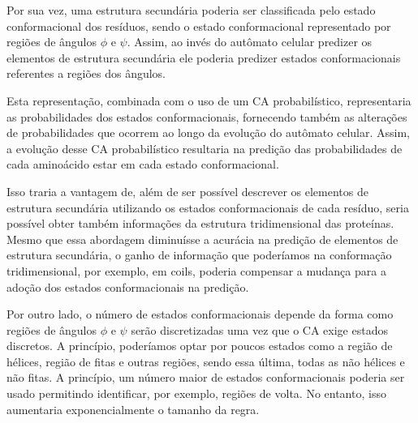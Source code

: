 Por sua vez, uma estrutura secundária poderia ser classificada pelo estado conformacional dos resíduos, sendo o estado conformacional representado por regiões de ângulos $\phi$ e $\psi$. Assim, ao invés do autômato celular predizer os elementos de estrutura secundária ele poderia predizer estados conformacionais referentes a regiões dos ângulos. 

Esta representação, combinada com o uso de um CA probabilístico, representaria as probabilidades dos estados conformacionais, fornecendo também as alterações de probabilidades que ocorrem ao longo da evolução do autômato celular. Assim, a evolução desse CA probabilístico resultaria na predição das probabilidades de cada aminoácido estar em cada estado conformacional.

Isso traria a vantagem de, além de ser possível descrever os elementos de estrutura secundária utilizando os estados conformacionais de cada resíduo, seria possível obter também informações da estrutura tridimensional das proteínas. Mesmo que essa abordagem diminuísse a acurácia na predição de elementos de estrutura secundária, o ganho de informação que poderíamos na conformação tridimensional, por exemplo, em coils, poderia compensar a mudança para a adoção dos estados conformacionais na predição.

Por outro lado, o número de estados conformacionais depende da forma como regiões de ângulos $\phi$ e $\psi$ serão discretizadas uma vez que o CA exige estados discretos. A princípio, poderíamos optar por poucos estados como a região de hélices, região de fitas e outras regiões, sendo essa última, todas as não hélices e não fitas. A princípio, um número maior de estados conformacionais poderia ser usado permitindo identificar, por exemplo, regiões de volta. No entanto, isso aumentaria exponencialmente o tamanho da regra.





